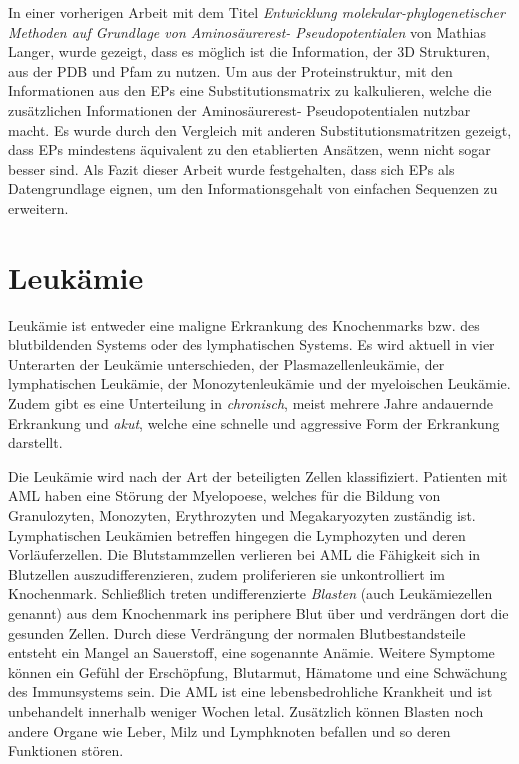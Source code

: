 In einer vorherigen Arbeit mit dem Titel \emph{Entwicklung molekular-phylogenetischer Methoden auf Grundlage von Aminosäurerest- Pseudopotentialen} von Mathias Langer, wurde gezeigt, dass es möglich ist die Information, der 3D Strukturen, aus der PDB und Pfam zu nutzen\cite{Mathias.2014}. Um aus der Proteinstruktur, mit den Informationen aus den EPs eine Substitutionsmatrix zu kalkulieren, welche die zusätzlichen Informationen der Aminosäurerest- Pseudopotentialen nutzbar macht. Es wurde durch den Vergleich mit anderen Substitutionsmatritzen gezeigt, dass EPs mindestens äquivalent zu den etablierten Ansätzen, wenn nicht sogar besser sind. Als Fazit dieser Arbeit wurde festgehalten, dass sich EPs als Datengrundlage eignen, um den Informationsgehalt von einfachen Sequenzen zu erweitern.


\section{Leukämie}
Leukämie ist entweder eine maligne Erkrankung des Knochenmarks bzw. des blutbildenden Systems oder des lymphatischen Systems. Es wird aktuell in vier Unterarten der Leukämie unterschieden, der Plasmazellenleukämie, der lymphatischen Leukämie, der Monozytenleukämie und der myeloischen Leukämie. Zudem gibt es eine Unterteilung in \emph{chronisch}, meist mehrere Jahre andauernde Erkrankung und \emph{akut}, welche eine schnelle und aggressive Form der Erkrankung darstellt.

Die Leukämie wird nach der Art der beteiligten Zellen klassifiziert. Patienten mit \ac{AML} haben eine Störung der Myelopoese, welches für die Bildung von Granulozyten, Monozyten, Erythrozyten und Megakaryozyten zuständig ist. Lymphatischen Leukämien betreffen hingegen die Lymphozyten und deren Vorläuferzellen. Die Blutstammzellen verlieren bei \ac{AML} die Fähigkeit sich in Blutzellen auszudifferenzieren, zudem proliferieren sie unkontrolliert im Knochenmark\cite{Papaemmanuil.2016}. Schließlich treten undifferenzierte \emph{Blasten} (auch Leukämiezellen genannt) aus dem Knochenmark ins periphere Blut über und verdrängen dort die gesunden Zellen. Durch diese Verdrängung der normalen Blutbestandsteile entsteht ein Mangel an Sauerstoff, eine sogenannte Anämie. Weitere Symptome können ein Gefühl der Erschöpfung, Blutarmut, Hämatome und eine Schwächung des Immunsystems sein. Die \ac{AML} ist eine lebensbedrohliche Krankheit und ist unbehandelt innerhalb weniger Wochen letal. Zusätzlich können Blasten noch andere Organe wie Leber, Milz und Lymphknoten befallen und so deren Funktionen stören.

